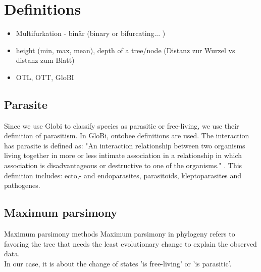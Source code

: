   \section{Definitions}

    \begin{itemize}
      \item Multifurkation - binär (binary or bifurcating... \cite{Felsenstein2003})
      \item height (min, max, mean), depth of a tree/node (Distanz zur Wurzel vs distanz zum Blatt)
      \item OTL, OTT, GloBI
    \end{itemize}

    \subsection{Parasite}
      Since we use Globi to classify species as parasitic or free-living, we use their definition of 
        parasitism. In GloBi, ontobee definitions are used.
      The interaction has parasite is defined as: "An interaction relationship between two organisms 
        living together in more or less intimate association in a relationship in which association is 
        disadvantageous or destructive to one of the organisms." \cite{...}. This definition includes: ecto,-
      and endoparasites, parasitoids, kleptoparasites and pathogenes.


    \subsection{Maximum parsimony}
      Maximum parsimony methods Maximum parsimony in phylogeny refers to favoring the tree that needs 
        the least evolutionary change to explain the observed data. \\
      In our case, it is about the change of states 'is free-living' or 'is parasitic'.


